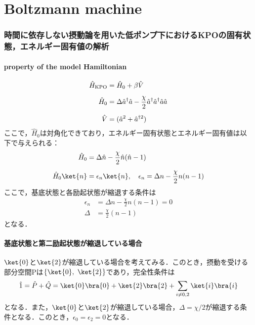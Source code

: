 \part{Boltzmann machine}
\section{時間に依存しない摂動論を用いた低ポンプ下におけるKPOの固有状態，エネルギー固有値の解析}
\subsection{property of the model Hamiltonian}
\begin{align}\label{Eq.GKSL}
    \hat{H}_{\rm{KPO}}&=\hat{H}_0 +\beta\hat{V}\\[5pt]
    \hat{H}_0&=\Delta \hat{a}^\dagger\hat{a} - \frac{\chi}{2} \hat{a}^\dagger\hat{a}^\dagger\hat{a}\hat{a}\\[5pt]
    \hat{V}&=(\hat{a}^2 + \hat{a}^{\dagger 2})
\end{align}
ここで，$\hat{H}_0$は対角化できており，エネルギー固有状態とエネルギー固有値は以下で与えられる：
\begin{align}
    \hat{H}_0&=\Delta \hat{n} - \frac{\chi}{2}\hat{n}(\hat{n}-1) \\[5pt]
    \hat{H}_0\ket{n}&=\epsilon_n\ket{n},\ \ \ 
    \epsilon_n = \Delta n - \frac{\chi}{2}n(n-1)
\end{align}
ここで，基底状態と各励起状態が縮退する条件は
\begin{align}
        \epsilon_n &= \Delta n - \frac{\chi}{2}n(n-1) =0\\[10pt]
        \Delta &= \frac{\chi}{2}(n-1)
\end{align}
となる．
\subsection{基底状態と第二励起状態が縮退している場合}
$\ket{0}$と$\ket{2}$が縮退している場合を考えてみる．このとき，摂動を受ける部分空間Pは$\{\ket{0},\ \ket{2}\}$であり，完全性条件は
\begin{equation}
    \hat{1} = \hat{P} + \hat{Q} 
    = \ket{0}\bra{0} + \ket{2}\bra{2} + \sum_{i\neq 0,2}\ket{i}\bra{i} 
\end{equation}
となる．また，$\ket{0}$と$\ket{2}$が縮退している場合，$\Delta=\chi/2$が縮退する条件となる．このとき，$\epsilon_0=\epsilon_2=0$となる．

